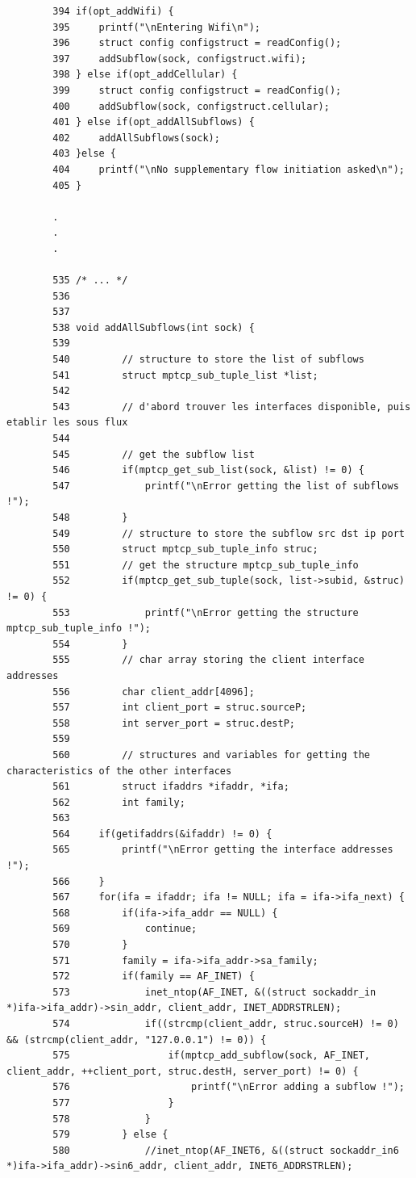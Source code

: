 \documentclass[a4paper,11pt]{article}
\begin{document}
	 	\begin{lstlisting}
		394	if(opt_addWifi) {
		395		printf("\nEntering Wifi\n");
		396		struct config configstruct = readConfig();
		397		addSubflow(sock, configstruct.wifi);
	    398	} else if(opt_addCellular) {
		399		struct config configstruct = readConfig();
		400		addSubflow(sock, configstruct.cellular);
	    401	} else if(opt_addAllSubflows) {
		402		addAllSubflows(sock);
	    403	}else {
		404		printf("\nNo supplementary flow initiation asked\n");
		405	}

		.
		.
		.

		535	/* ... */
		536
		537
		538	void addAllSubflows(int sock) { 
		539	     
		540	        // structure to store the list of subflows
		541	        struct mptcp_sub_tuple_list *list;
		542	    
		543	        // d'abord trouver les interfaces disponible, puis etablir les sous flux
		544	    
		545	        // get the subflow list 
		546	        if(mptcp_get_sub_list(sock, &list) != 0) {
		547	            printf("\nError getting the list of subflows !");
		548	        }
		549	        // structure to store the subflow src dst ip port
		550	        struct mptcp_sub_tuple_info struc;
		551	        // get the structure mptcp_sub_tuple_info
		552	        if(mptcp_get_sub_tuple(sock, list->subid, &struc) != 0) {
		553	            printf("\nError getting the structure mptcp_sub_tuple_info !");
		554	        }
		555	        // char array storing the client interface addresses
		556	        char client_addr[4096];
		557	        int client_port = struc.sourceP;
		558	        int server_port = struc.destP;
		559	        
		560	        // structures and variables for getting the characteristics of the other interfaces
		561	        struct ifaddrs *ifaddr, *ifa;
		562	        int family;
		563
		564		if(getifaddrs(&ifaddr) != 0) {
		565			printf("\nError getting the interface addresses !");
		566		}
		567		for(ifa = ifaddr; ifa != NULL; ifa = ifa->ifa_next) {
		568			if(ifa->ifa_addr == NULL) {
		569				continue;
		570			}
		571			family = ifa->ifa_addr->sa_family;
		572			if(family == AF_INET) {
		573				inet_ntop(AF_INET, &((struct sockaddr_in *)ifa->ifa_addr)->sin_addr, client_addr, INET_ADDRSTRLEN);
		574				if((strcmp(client_addr, struc.sourceH) != 0) && (strcmp(client_addr, "127.0.0.1") != 0)) {
		575					if(mptcp_add_subflow(sock, AF_INET, client_addr, ++client_port, struc.destH, server_port) != 0) {
		576						printf("\nError adding a subflow !");
		577					}
		578				}
		579			} else {
		580				//inet_ntop(AF_INET6, &((struct sockaddr_in6 *)ifa->ifa_addr)->sin6_addr, client_addr, INET6_ADDRSTRLEN);

\end{lstlisting}
\end{document}
